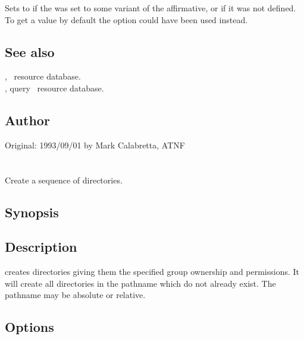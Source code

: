 \noindent
Sets  to  if the  was
set to some variant of the affirmative, or if it was not defined.  To get a
 value by default the  option could have been used
instead.

\subsection*{See also}

, \aipspp\ resource database.\\
, query \aipspp\ resource database.

\subsection*{Author}

Original: 1993/09/01 by Mark Calabretta, ATNF


\newpage
\section{}
\label{amkdir}



Create a sequence of directories.

\subsection*{Synopsis}

\begin{synopsis}
\end{synopsis}

\subsection*{Description}

 creates directories giving them the specified group ownership and
permissions.  It will create all directories in the pathname which do not
already exist.  The pathname may be absolute or relative.

\subsection*{Options}

